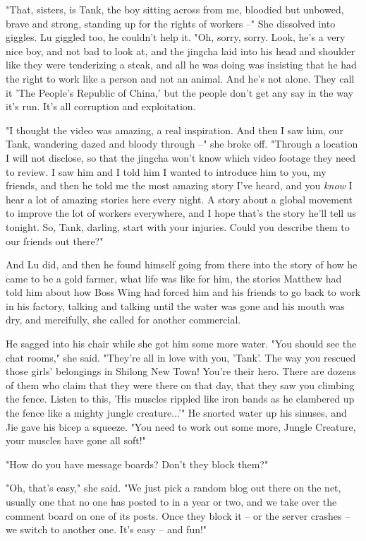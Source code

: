 "That, sisters, is Tank, the boy sitting across from me, bloodied
but unbowed, brave and strong, standing up for the rights of
workers --" She dissolved into giggles. Lu giggled too, he couldn't
help it. "Oh, sorry, sorry. Look, he's a very nice boy, and not bad
to look at, and the jingcha laid into his head and shoulder like
they were tenderizing a steak, and all he was doing was insisting
that he had the right to work like a person and not an animal. And
he's not alone. They call it 'The People's Republic of China,' but
the people don't get any say in the way it's run. It's all
corruption and exploitation.

"I thought the video was amazing, a real inspiration. And then I
saw him, our Tank, wandering dazed and bloody through --" she broke
off. "Through a location I will not disclose, so that the jingcha
won't know which video footage they need to review. I saw him and I
told him I wanted to introduce him to you, my friends, and then he
told me the most amazing story I've heard, and you \emph{know} I
hear a lot of amazing stories here every night. A story about a
global movement to improve the lot of workers everywhere, and I
hope that's the story he'll tell us tonight. So, Tank, darling,
start with your injuries. Could you describe them to our friends
out there?"

And Lu did, and then he found himself going from there into the
story of how he came to be a gold farmer, what life was like for
him, the stories Matthew had told him about how Boss Wing had
forced him and his friends to go back to work in his factory,
talking and talking until the water was gone and his mouth was dry,
and mercifully, she called for another commercial.

He sagged into his chair while she got him some more water. "You
should see the chat rooms," she said. "They're all in love with
you, 'Tank'. The way you rescued those girls' belongings in Shilong
New Town! You're their hero. There are dozens of them who claim
that they were there on that day, that they saw you climbing the
fence. Listen to this, 'His muscles rippled like iron bands as he
clambered up the fence like a mighty jungle creature...'" He
snorted water up his sinuses, and Jie gave his bicep a squeeze.
"You need to work out some more, Jungle Creature, your muscles have
gone all soft!"

"How do you have message boards? Don't they block them?"

"Oh, that's easy," she said. "We just pick a random blog out there
on the net, usually one that no one has posted to in a year or two,
and we take over the comment board on one of its posts. Once they
block it -- or the server crashes -- we switch to another one. It's
easy -- and fun!"


